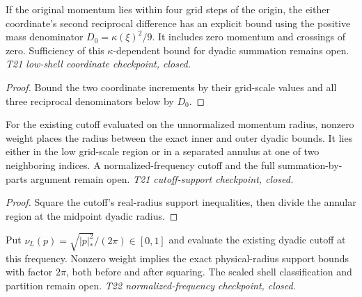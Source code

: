 \begin{lemma}
  \label{lem:symbol-low-shell}
  \leanok
  If the original momentum lies within four grid steps of the origin, the
  either coordinate's second reciprocal difference has an explicit bound using
  the positive mass denominator $D_0=\kappa(\xi)^2/9$. It includes zero
  momentum and crossings of zero. Sufficiency of this
  $\kappa$-dependent bound for dyadic summation remains open.
  \emph{T21 low-shell coordinate checkpoint, closed.}
\end{lemma}
\begin{proof}\leanok
  Bound the two coordinate increments by their grid-scale values and all
  three reciprocal denominators below by $D_0$.
\end{proof}

\begin{lemma}
  \label{lem:symbol-cutoff-shell}
  \leanok
  For the existing cutoff evaluated on the unnormalized momentum radius,
  nonzero weight places the radius between the exact inner and outer dyadic
  bounds. It lies either in the low grid-scale region or in a separated
  annulus at one of two neighboring indices. A normalized-frequency cutoff
  and the full summation-by-parts argument remain open.
  \emph{T21 cutoff-support checkpoint, closed.}
\end{lemma}
\begin{proof}\leanok
  Square the cutoff's real-radius support inequalities, then divide the
  annular region at the midpoint dyadic radius.
\end{proof}

\begin{definition}
  \label{def:normalized-frequency}
  \leanok
  Put $\nu_L(p)=\sqrt{|p|_*^2}/(2\pi)\in[0,1]$ and evaluate the existing
  dyadic cutoff at this frequency. Nonzero weight implies the exact
  physical-radius support bounds with factor $2\pi$, both before and after
  squaring. The scaled shell classification and partition remain open.
  \emph{T22 normalized-frequency checkpoint, closed.}
\end{definition}

